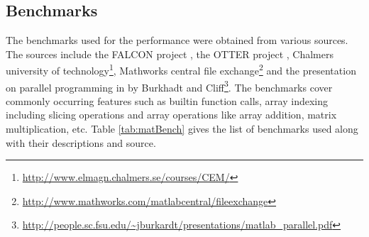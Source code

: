 \subsection{\matlab Benchmarks}
The \matlab benchmarks used for the performance were obtained from various sources. The sources include the FALCON project\cite{DeRose:1999} , the OTTER project \cite{quinn}, Chalmers university of technology\footnote{\url{http://www.elmagn.chalmers.se/courses/CEM/}}, Mathworks central file exchange\footnote{\url{http://www.mathworks.com/matlabcentral/fileexchange}} and the presentation on parallel programming in \matlab by Burkhadt and Cliff\footnote{\url{http://people.sc.fsu.edu/~jburkardt/presentations/matlab_parallel.pdf}}. The benchmarks cover commonly occurring \matlab features such as builtin function calls, array indexing including slicing operations and array operations like array addition, matrix multiplication, etc. Table \ref{tab:matBench} gives the list of benchmarks used along with their descriptions and source.  
